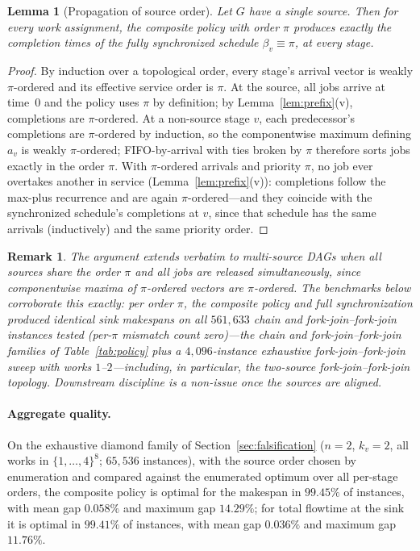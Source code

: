 \documentclass[sn-mathphys,NameDate]{sn-jnl}
\theoremstyle{thmstyleone}
\newtheorem{lemma}[theorem]{Lemma}
\theoremstyle{thmstylethree}
\theoremstyle{thmstyletwo}
\newtheorem{remark}[theorem]{Remark}
\begin{document}
\begin{lemma}[Propagation of source order]
\label{lem:propagation}
Let $G$ have a single source. Then for every work assignment,
the composite policy with order $\pi$ produces exactly the
completion times of the fully synchronized schedule
$\beta_v \equiv \pi$, at every stage.
\end{lemma}

\begin{proof}
By induction over a topological order, every stage's arrival
vector is weakly $\pi$-ordered and its effective service order
is $\pi$. At the source, all jobs arrive at time~0 and the
policy uses $\pi$ by definition; by
Lemma~\ref{lem:prefix}(v), completions are $\pi$-ordered. At a
non-source stage $v$, each predecessor's completions are
$\pi$-ordered by induction, so the componentwise maximum
defining $a_v$ is weakly $\pi$-ordered; FIFO-by-arrival with
ties broken by $\pi$ therefore sorts jobs exactly in the order
$\pi$. With $\pi$-ordered arrivals and priority $\pi$, no job
ever overtakes another in service
(Lemma~\ref{lem:prefix}(v)): completions follow the max-plus
recurrence and are again $\pi$-ordered---and they coincide
with the synchronized schedule's completions at $v$, since
that schedule has the same arrivals (inductively) and the same
priority order.
\end{proof}

\begin{remark}
\label{rem:multisource}
The argument extends verbatim to multi-source DAGs when all
sources share the order $\pi$ and all jobs are released
simultaneously, since componentwise maxima of $\pi$-ordered
vectors are $\pi$-ordered. The benchmarks below corroborate
this exactly: per order $\pi$, the composite policy and full
synchronization produced identical sink makespans on all
$561{,}633$ chain and fork-join--fork-join instances tested
(per-$\pi$ mismatch count zero)---the chain and
fork-join--fork-join families of Table~\ref{tab:policy} plus
a $4{,}096$-instance exhaustive fork-join--fork-join sweep
with works $1$--$2$---including, in particular, the
two-source fork-join--fork-join topology. Downstream
discipline is a non-issue once the sources are aligned.
\end{remark}

\paragraph{Aggregate quality.}
On the exhaustive diamond family of
Section~\ref{sec:falsification} ($n = 2$, $k_v = 2$, all works
in $\{1,\ldots,4\}^8$; $65{,}536$ instances), with the source
order chosen by enumeration and compared against the
enumerated optimum over all per-stage orders, the composite
policy is optimal for the makespan in $99.45\%$ of instances,
with mean gap $0.058\%$ and maximum gap $14.29\%$; for total
flowtime at the sink it is optimal in $99.41\%$ of instances,
with mean gap $0.036\%$ and maximum gap $11.76\%$.
\end{document}
